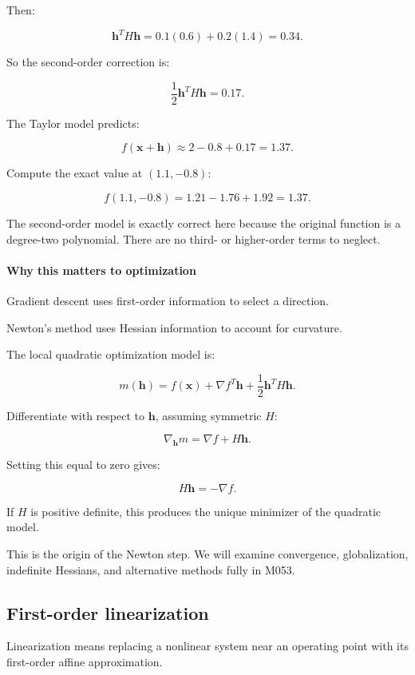 Then:

\[
\mathbf h^TH\mathbf h = 0.1(0.6)+0.2(1.4) =0.34.
\]

So the second-order correction is:

\[
\frac12\mathbf h^TH\mathbf h=0.17.
\]

The Taylor model predicts:

\[
f(\mathbf x+\mathbf h) \approx2-0.8+0.17=\boxed{1.37}.
\]

Compute the exact value at \((1.1,-0.8)\):

\[
f(1.1,-0.8) =1.21-1.76+1.92 =\boxed{1.37}.
\]

The second-order model is exactly correct here because the original function is a degree-two polynomial. There are no third- or higher-order terms to neglect.

\paragraph{Why this matters to optimization}\label{02-foundations-ii-ch021-why-this-matters-to-optimization}

Gradient descent uses first-order information to select a direction.

Newton's method uses Hessian information to account for curvature.

The local quadratic optimization model is:

\[
m(\mathbf h)= f(\mathbf x)+ \nabla f^T\mathbf h+ \frac12\mathbf h^TH\mathbf h.
\]

Differentiate with respect to \(\mathbf h\), assuming symmetric \(H\):

\[
\nabla_{\mathbf h}m=\nabla f+H\mathbf h.
\]

Setting this equal to zero gives:

\[
\boxed{H\mathbf h=-\nabla f}.
\]

If \(H\) is positive definite, this produces the unique minimizer of the quadratic model.

This is the origin of the Newton step. We will examine convergence, globalization, indefinite Hessians, and alternative methods fully in M053.

\subsection{First-order linearization}\label{02-foundations-ii-ch021-first-order-linearization}

Linearization means replacing a nonlinear system near an operating point with its first-order affine approximation.

